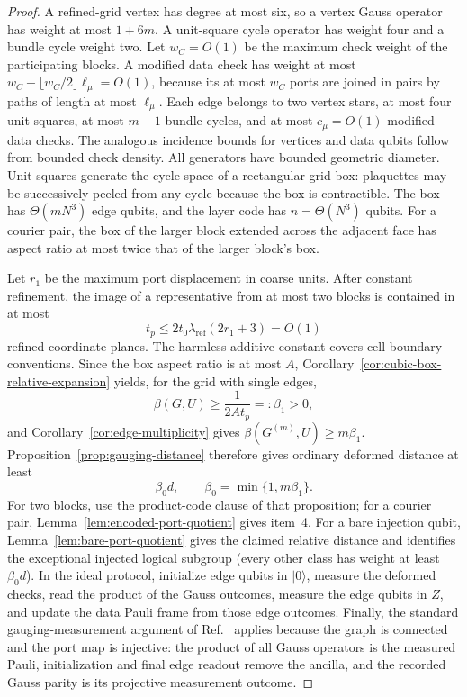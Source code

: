 \documentclass[aps,prx,reprint,superscriptaddress,nofootinbib,floatfix,longbibliography]{revtex4-2}
\theoremstyle{definition}
\begin{document}
\begin{proof}
A refined-grid vertex has degree at most six, so a vertex Gauss operator
has weight at most $1+6m$.  A unit-square cycle operator has weight four and
a bundle cycle weight two.  Let $w_C=O(1)$ be the maximum check weight of the participating blocks.  A modified data check has weight at most
$w_C+\lfloor w_C/2\rfloor\ell_\mu=O(1)$, because its at most $w_C$ ports are
joined in pairs by paths of length at most $\ell_\mu$.  Each edge belongs to
two vertex stars, at most four unit squares, at most $m-1$ bundle cycles, and
at most $c_\mu=O(1)$ modified data checks.  The analogous incidence bounds for
vertices and data qubits follow from bounded check density.  All generators
have bounded geometric diameter.  Unit squares generate the cycle space of
a rectangular grid box: plaquettes may be successively peeled from any
cycle because the box is contractible.  The box has $\Theta(mN^3)$ edge qubits,
and the layer code has $n=\Theta(N^3)$ qubits.  For a courier pair, the box
of the larger block extended across the adjacent face has aspect ratio at most
twice that of the larger block's box.

Let $r_1$ be the maximum port displacement in coarse units.  After constant
refinement, the image of a representative from at most two blocks is
contained in at most
\begin{equation}
 t_p\leq 2t_0\lambda_{\mathrm{ref}}(2r_1+3)=O(1)
 \label{eq:number-port-planes}
\end{equation}
refined coordinate planes.  The harmless additive constant covers cell
boundary conventions.  Since the box aspect ratio is at most $A$,
Corollary~\ref{cor:cubic-box-relative-expansion} yields, for the grid with
single edges,
\begin{equation}
 \beta(G,U)\geq \frac{1}{2At_p}=: \beta_1>0,
\end{equation}
and Corollary~\ref{cor:edge-multiplicity} gives
$\beta(G^{(m)},U)\geq m\beta_1$.  Proposition~\ref{prop:gauging-distance}
therefore gives ordinary deformed distance at least
\begin{equation}
 \beta_0d,\qquad
 \beta_0=\min\{1,m\beta_1\}.
\end{equation}
For two blocks, use the product-code clause of that proposition; for a
courier pair, Lemma~\ref{lem:encoded-port-quotient} gives item~4.  For a
bare injection qubit, Lemma~\ref{lem:bare-port-quotient} gives the claimed
relative distance and identifies the exceptional injected logical subgroup (every other class has weight at least $\beta_0d$).
In the ideal protocol, initialize edge qubits in $|0\rangle$, measure the deformed checks, read the product of the Gauss outcomes, measure the edge qubits in $Z$, and update the data Pauli frame from those edge outcomes. Finally, the standard gauging-measurement argument of Ref.~\cite{WilliamsonYoderGauging} applies because the
graph is connected and the port map is injective: the product of all Gauss
operators is the measured Pauli, initialization and final edge readout
remove the ancilla, and the recorded Gauss parity is its projective
measurement outcome.
\end{proof}
\end{document}
